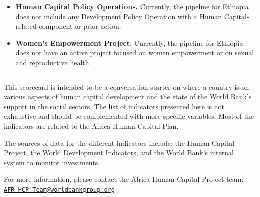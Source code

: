 \documentclass[9.2pt,twocolumn]{article}
\begin{document}
\begin{itemize}
\item
  \textbf{Human Capital Policy Operations.} Currently, the pipeline for
  Ethiopia does not include any Development Policy Operation with a
  Human Capital-related component or prior action.
\item
  \textbf{Women's Empowerment Project.} Currently, the pipeline for
  Ethiopia does not have an active project focused on women empowerment
  or on sexual and reproductive health.
\end{itemize}

\noindent

\rule{9cm}{0.4pt}

This scorecard is intended to be a conversation starter on where a
country is on various aspects of human capital development and the state
of the World Bank's support in the social sectors. The list of
indicators presented here is not exhaustive and should be complemented
with more specific variables. Most of the indicators are related to the
Africa Human Capital Plan. ~

The sources of data for the different indicators include: the Human
Capital Project, the World Development Indicators, and the World Bank's
internal system to monitor investments. ~

For more information, please contact the Africa Human Capital Project
team:
\href{mailto:AFR_HCP_Team@worldbankgroup.org}{\nolinkurl{AFR\_HCP\_Team@worldbankgroup.org}}
\end{document}
